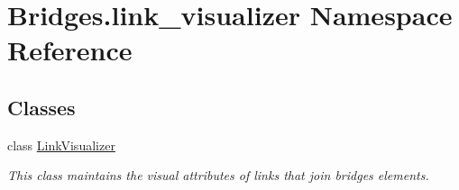 \hypertarget{namespace_bridges_1_1link__visualizer}{}\section{Bridges.\+link\+\_\+visualizer Namespace Reference}
\label{namespace_bridges_1_1link__visualizer}
\subsection*{Classes}
\begin{DoxyCompactItemize}
\item 
class \mbox{\hyperlink{class_bridges_1_1link__visualizer_1_1_link_visualizer}{Link\+Visualizer}}
\begin{DoxyCompactList}\small\item\em This class maintains the visual attributes of links that join bridges elements. \end{DoxyCompactList}\end{DoxyCompactItemize}
